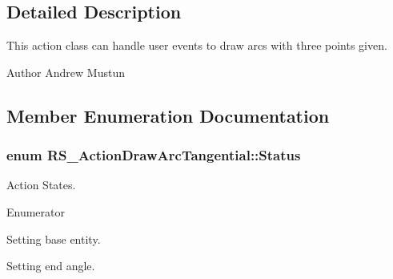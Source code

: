 \subsection{Detailed Description}
This action class can handle user events to draw arcs with three points given.

\begin{DoxyAuthor}{Author}
Andrew Mustun 
\end{DoxyAuthor}


\subsection{Member Enumeration Documentation}
\hypertarget{classRS__ActionDrawArcTangential_a64a8a77f45d438b8da2b64a9c735eafd}{
\subsubsection[{Status}]{\setlength{\rightskip}{0pt plus 5cm}enum {\bf R\-S\-\_\-\-Action\-Draw\-Arc\-Tangential\-::\-Status}}}\label{classRS__ActionDrawArcTangential_a64a8a77f45d438b8da2b64a9c735eafd}
Action States. \begin{Desc}
\item[Enumerator]\par
\begin{description}
\item[{\em 
\hypertarget{classRS__ActionDrawArcTangential_a64a8a77f45d438b8da2b64a9c735eafdaefd5067c5b858c6751389c1bb66fa81a}{Set\-Base\-Entity}\label{classRS__ActionDrawArcTangential_a64a8a77f45d438b8da2b64a9c735eafdaefd5067c5b858c6751389c1bb66fa81a}
}]Setting base entity. \item[{\em 
\hypertarget{classRS__ActionDrawArcTangential_a64a8a77f45d438b8da2b64a9c735eafdaacd4bcca25c4aa8c18dbd041a8365d2b}{Set\-End\-Angle}\label{classRS__ActionDrawArcTangential_a64a8a77f45d438b8da2b64a9c735eafdaacd4bcca25c4aa8c18dbd041a8365d2b}
}]Setting end angle. \end{description}
\end{Desc}


